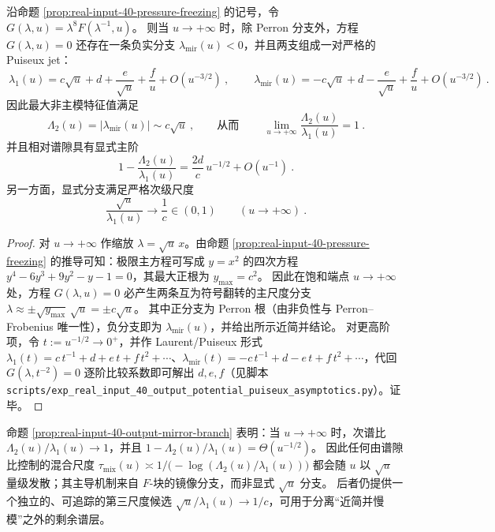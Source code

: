 \begin{proposition}\label{prop:real-input-40-output-mirror-branch}
沿命题 \ref{prop:real-input-40-pressure-freezing} 的记号，令 \(G(\lambda,u)=\lambda^8F(\lambda^{-1},u)\)。
则当 \(u\to+\infty\) 时，除 Perron 分支外，方程 \(G(\lambda,u)=0\) 还存在一条负实分支 \(\lambda_{\mathrm{mir}}(u)<0\)，并且两支组成一对严格的 Puiseux jet：
\[
\boxed{\ \lambda_1(u)=c\sqrt u+d+\frac{e}{\sqrt u}+\frac{f}{u}+O\!\left(u^{-3/2}\right)\ },
\qquad
\boxed{\ \lambda_{\mathrm{mir}}(u)=-c\sqrt u+d-\frac{e}{\sqrt u}+\frac{f}{u}+O\!\left(u^{-3/2}\right)\ }.
\]
因此最大非主模特征值满足
\[
\boxed{\ \Lambda_2(u)=|\lambda_{\mathrm{mir}}(u)|\sim c\sqrt u\ },
\qquad\text{从而}\qquad
\boxed{\ \lim_{u\to+\infty}\frac{\Lambda_2(u)}{\lambda_1(u)}=1\ }.
\]
并且相对谱隙具有显式主阶
\[
\boxed{\ 1-\frac{\Lambda_2(u)}{\lambda_1(u)}=\frac{2d}{c}\,u^{-1/2}+O(u^{-1})\ }.
\]
另一方面，显式分支满足严格次级尺度
\[
\boxed{\ \frac{\sqrt u}{\lambda_1(u)}\longrightarrow \frac{1}{c}\in(0,1)\qquad(u\to+\infty)\ }.
\]
\end{proposition}
\begin{proof}
对 \(u\to+\infty\) 作缩放 \(\lambda=\sqrt u\,x\)。由命题 \ref{prop:real-input-40-pressure-freezing} 的推导可知：极限主方程可写成 \(y=x^2\) 的四次方程
\(
y^4-6y^3+9y^2-y-1=0
\)，其最大正根为 \(y_{\max}=c^2\)。
因此在饱和端点 \(u\to+\infty\) 处，方程 \(G(\lambda,u)=0\) 必产生两条互为符号翻转的主尺度分支
\(
\lambda\approx \pm\sqrt{y_{\max}}\,\sqrt u=\pm c\sqrt u
\)。
其中正分支为 Perron 根（由非负性与 Perron--Frobenius 唯一性），负分支即为 \(\lambda_{\mathrm{mir}}(u)\)，并给出所示近简并结论。
对更高阶项，令 \(t:=u^{-1/2}\to 0^+\)，并作 Laurent/Puiseux 形式
\(\lambda_1(t)=c\,t^{-1}+d+e\,t+f\,t^2+\cdots\)、\(\lambda_{\mathrm{mir}}(t)=-c\,t^{-1}+d-e\,t+f\,t^2+\cdots\)，代回 \(G(\lambda,t^{-2})=0\) 逐阶比较系数即可解出 \(d,e,f\)（见脚本 \texttt{scripts/exp\_real\_input\_40\_output\_potential\_puiseux\_asymptotics.py}）。证毕。
\end{proof}

\begin{remark}[含义：混合时间的饱和端点发散由镜像分支驱动]\label{rem:real-input-40-output-mirror-mixing}
命题 \ref{prop:real-input-40-output-mirror-branch} 表明：当 \(u\to+\infty\) 时，次谱比 \(\Lambda_2(u)/\lambda_1(u)\to 1\)，并且
\(
1-\Lambda_2(u)/\lambda_1(u)=\Theta(u^{-1/2})
\)。
因此任何由谱隙比控制的混合尺度
\(
\tau_{\mathrm{mix}}(u)\asymp 1/\bigl(-\log(\Lambda_2(u)/\lambda_1(u))\bigr)
\)
都会随 \(u\) 以 \(\sqrt u\) 量级发散；其主导机制来自 \(F\)-块的镜像分支，而非显式 \(\sqrt u\) 分支。
后者仍提供一个独立的、可追踪的第三尺度候选 \(\sqrt u/\lambda_1(u)\to 1/c\)，可用于分离“近简并慢模”之外的剩余谱层。
\end{remark}


